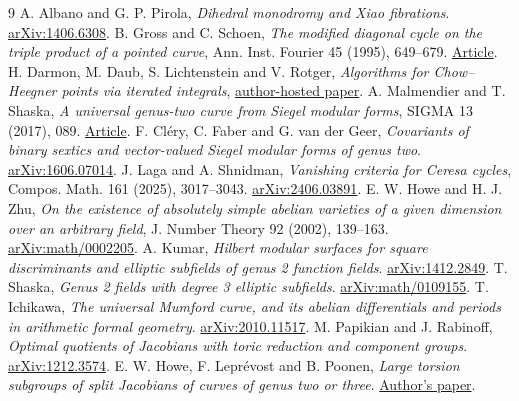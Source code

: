 \documentclass[11pt]{article}
\begin{document}
\begin{thebibliography}{9}
 A. Albano and G. P. Pirola, \emph{Dihedral monodromy and Xiao fibrations}.
\href{https://arxiv.org/abs/1406.6308}{arXiv:1406.6308}.
 B. Gross and C. Schoen, \emph{The modified diagonal cycle on the triple
product of a pointed curve}, Ann. Inst. Fourier 45 (1995), 649--679.
\href{https://doi.org/10.5802/aif.1469}{Article}.
 H. Darmon, M. Daub, S. Lichtenstein and V. Rotger,
\emph{Algorithms for Chow--Heegner points via iterated integrals},
\href{https://wstein.org/papers/mcom2927-chow-heegner.pdf}{author-hosted paper}.
 A. Malmendier and T. Shaska, \emph{A universal genus-two curve from
Siegel modular forms}, SIGMA 13 (2017), 089.
\href{https://sigma-journal.com/2017/089/}{Article}.
 F. Cl\'ery, C. Faber and G. van der Geer,
\emph{Covariants of binary sextics and vector-valued Siegel modular forms of genus two}.
\href{https://arxiv.org/abs/1606.07014}{arXiv:1606.07014}.
 J. Laga and A. Shnidman, \emph{Vanishing criteria for Ceresa cycles},
Compos. Math. 161 (2025), 3017--3043.
\href{https://arxiv.org/abs/2406.03891}{arXiv:2406.03891}.
 E. W. Howe and H. J. Zhu, \emph{On the existence of absolutely simple
abelian varieties of a given dimension over an arbitrary field},
J. Number Theory 92 (2002), 139--163.
\href{https://arxiv.org/abs/math/0002205}{arXiv:math/0002205}.
 A. Kumar, \emph{Hilbert modular surfaces for square discriminants and
elliptic subfields of genus 2 function fields}.
\href{https://arxiv.org/abs/1412.2849}{arXiv:1412.2849}.
 T. Shaska, \emph{Genus 2 fields with degree 3 elliptic subfields}.
\href{https://arxiv.org/abs/math/0109155}{arXiv:math/0109155}.
 T. Ichikawa, \emph{The universal Mumford curve, and its abelian
differentials and periods in arithmetic formal geometry}.
\href{https://arxiv.org/abs/2010.11517}{arXiv:2010.11517}.
 M. Papikian and J. Rabinoff, \emph{Optimal quotients of Jacobians
with toric reduction and component groups}.
\href{https://arxiv.org/abs/1212.3574}{arXiv:1212.3574}.
 E. W. Howe, F. Lepr\'evost and B. Poonen, \emph{Large torsion
subgroups of split Jacobians of curves of genus two or three}.
\href{https://math.mit.edu/~poonen/papers/large.pdf}{Author's paper}.
\end{thebibliography}
\end{document}
